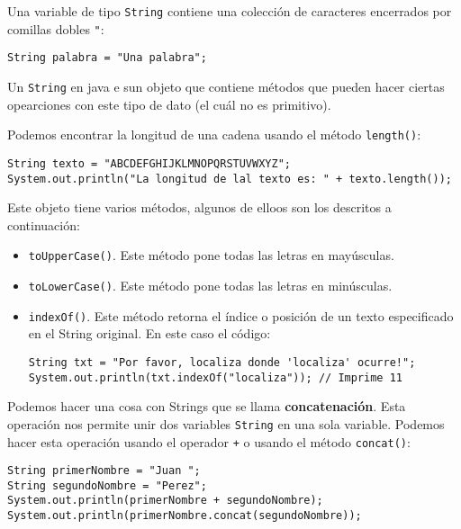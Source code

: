 \documentclass[12pt]{article}
\newcounter{it}
\theoremstyle{largebreak}
\begin{document}
    Una variable de tipo \lstinline|String| contiene una colección de caracteres encerrados por comillas dobles \lstinline|"|:
    \begin{center}
        \lstinline|String palabra = "Una palabra";|
    \end{center}

    Un \lstinline|String| en java e sun objeto que contiene métodos que pueden hacer ciertas opearciones con este tipo de dato (el cuál no es primitivo).

    \begin{exa}
        Podemos encontrar la longitud de una cadena usando el método \lstinline|length()|:
        \begin{lstlisting}[caption={Longitud de un \lstinline|String|.},label=DescriptiveLabel]
String texto = "ABCDEFGHIJKLMNOPQRSTUVWXYZ";
System.out.println("La longitud de lal texto es: " + texto.length());
        \end{lstlisting}
    \end{exa}

    Este objeto tiene varios métodos, algunos de elloos son los descritos a continuación:
    \begin{itemize}
        \item \lstinline|toUpperCase()|. Este método pone todas las letras en mayúsculas.
        \item \lstinline|toLowerCase()|. Este método pone todas las letras en minúsculas.
        \item \lstinline|indexOf()|. Este método retorna el índice o posición de un texto especificado en el String original. En este caso el código:
        \begin{lstlisting}[caption={Localización de texto en un \lstinline|String|.},label=DescriptiveLabel]
String txt = "Por favor, localiza donde 'localiza' ocurre!";
System.out.println(txt.indexOf("localiza")); // Imprime 11
        \end{lstlisting}
    \end{itemize}

    Podemos hacer una cosa con Strings que se llama \textbf{concatenación}. Esta operación nos permite unir dos variables \lstinline|String| en una sola variable. Podemos hacer esta operación usando el operador \lstinline|+| o usando el método \lstinline|concat()|:
    \begin{lstlisting}[caption={Suma y Concatenación de Strings.},label=DescriptiveLabel]
String primerNombre = "Juan ";
String segundoNombre = "Perez";
System.out.println(primerNombre + segundoNombre);
System.out.println(primerNombre.concat(segundoNombre));
    \end{lstlisting}
\end{document}
